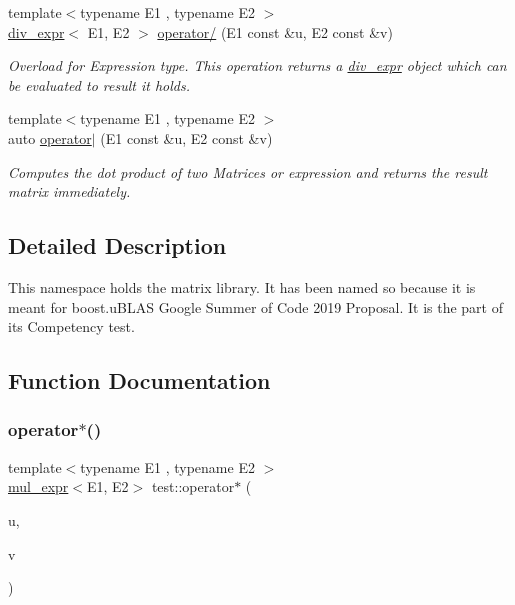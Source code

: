 \begin{DoxyCompactItemize}
{\footnotesize template$<$typename E1 , typename E2 $>$ }\\\mbox{\hyperlink{classtest_1_1div__expr}{div\+\_\+expr}}$<$ E1, E2 $>$ \mbox{\hyperlink{namespacetest_a3de54d71b553c223f2b4619023186a17}{operator/}} (E1 const \&u, E2 const \&v)
\begin{DoxyCompactList}\small\item\em Overload for Expression type. This operation returns a \mbox{\hyperlink{classtest_1_1div__expr}{div\+\_\+expr}} object which can be evaluated to result it holds. \end{DoxyCompactList}\item 
{\footnotesize template$<$typename E1 , typename E2 $>$ }\\auto \mbox{\hyperlink{namespacetest_a66f5af8ef66f6c5a47d2a5075a63fd3a}{operator$\vert$}} (E1 const \&u, E2 const \&v)
\begin{DoxyCompactList}\small\item\em Computes the dot product of two Matrices or expression and returns the result matrix immediately. \end{DoxyCompactList}\end{DoxyCompactItemize}


\subsection{Detailed Description}
This namespace holds the matrix library. It has been named so because it is meant for boost.\+u\+B\+L\+AS Google Summer of Code 2019 Proposal. It is the part of it\textquotesingle{}s Competency test. 



\subsection{Function Documentation}
\mbox{\label{namespacetest_a56ea9d576f5f2398586286d7f01fba47}} 
\subsubsection{\texorpdfstring{operator$\ast$()}{operator*()}}
{\footnotesize\ttfamily template$<$typename E1 , typename E2 $>$ \\
\mbox{\hyperlink{classtest_1_1mul__expr}{mul\+\_\+expr}}$<$E1, E2$>$ test\+::operator$\ast$ (\begin{DoxyParamCaption}\item[{E1 const \&}]{u,  }\item[{E2 const \&}]{v }\end{DoxyParamCaption})}



